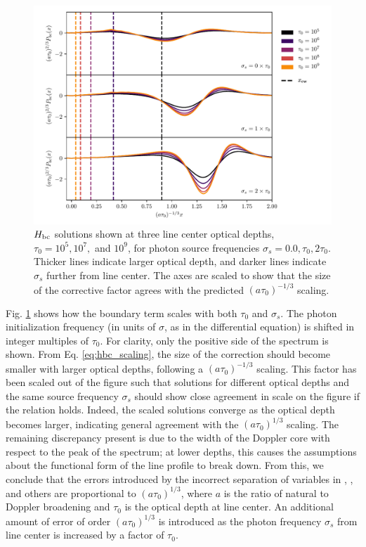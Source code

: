 \documentclass{aastex63}
\begin{document}
\begin{figure}
    \centering
    \includegraphics{xinit.pdf}
    \caption{$H_{\rm bc}$ solutions shown at three line center optical depths, $\tau_0=10^5, 10^7,$ and $10^9$, for photon source frequencies $\sigma_s=0.0, \tau_0, 2\tau_0$. Thicker lines indicate larger optical depth, and darker lines indicate $\sigma_s$ further from line center. The axes are scaled to show that the size of the corrective factor agrees with the predicted $(a\tau_0)^{-1/3}$ scaling.}
    \label{fig:xinit}
\end{figure}

Fig. \ref{fig:xinit} shows how the boundary term scales with both $\tau_0$ and $\sigma_s$. The photon initialization frequency (in units of $\sigma$, as in the differential equation) is shifted in integer multiples of $\tau_0$. For clarity, only the positive side of the spectrum is shown. From Eq. \ref{eq:hbc_scaling}, the size of the correction should become smaller with larger optical depths, following a $(a\tau_0)^{-1/3}$ scaling. This factor has been scaled out of the figure such that solutions for different optical depths and the same source frequency $\sigma_s$ should show close agreement in scale on the figure if the relation holds. Indeed, the scaled solutions converge as the optical depth becomes larger, indicating general agreement with the $(a\tau_0)^{1/3}$ scaling. The remaining discrepancy present is due to the width of the Doppler core with respect to the peak of the spectrum; at lower depths, this causes the assumptions about the functional form of the line profile to break down. From this, we conclude that the errors introduced by the incorrect separation of variables in \cite{1973MNRAS.162...43H}, \cite{1990ApJ...350..216N}, \cite{2006ApJ...649...14D} and others are proportional to $(a\tau_0)^{1/3}$, where $a$ is the ratio of natural to Doppler broadening and $\tau_0$ is the optical depth at line center. An additional amount of error of order $(a\tau_0)^{1/3}$ is introduced as the photon frequency $\sigma_s$ from line center is increased by a factor of $\tau_0$.
\end{document}
